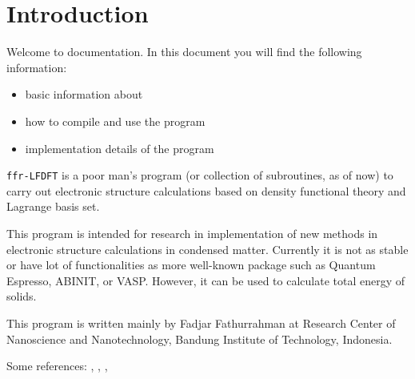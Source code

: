 \section{Introduction}

Welcome to \ffrLFDFT documentation.
In this document you will find the following information:
\begin{itemize}
\item basic information about \ffrLFDFT
\item how to compile and use the program
\item implementation details of the program
\end{itemize}

{\tt ffr-LFDFT} is a poor man's program (or collection of subroutines, as of now)
to carry out electronic structure calculations based on density functional theory
and Lagrange basis set.

This program is intended for research in implementation of new methods in
electronic structure calculations in condensed matter.
Currently it is not as stable or have lot of functionalities
as more well-known package such as Quantum Espresso, ABINIT, or VASP.
However, it can be used to calculate total energy of solids.

This program is written mainly by Fadjar Fathurrahman at Research Center
of Nanoscience and Nanotechnology, Bandung Institute of Technology, Indonesia.


Some references: \cite{Liu2003}, \cite{HeeSeungLee2006}, \cite{Ma2010},
\cite{Baye2015}
